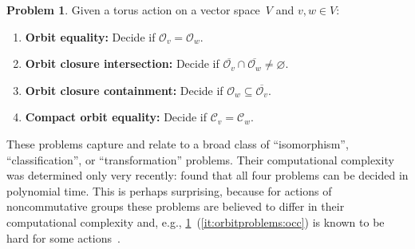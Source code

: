 \documentclass[10pt,a4paper]{article}
\theoremstyle{definition}
\newtheorem{problem}[theorem]{Problem}\crefname{problem}{Problem}{Problems}
\newcommand{\OO}{\ensuremath{\mathcal{O}}}
\newcommand{\KK}{\ensuremath{\mathcal{C}}}
\numberwithin{equation}{section}
\begin{document}
\begin{problem}\label{prob:orbitproblems}
  Given a torus action on a vector space~$V$ and $v,w\in V$:
  \begin{enumerate}
    \item\label{it:orbitproblems:eq} \textbf{Orbit equality:} Decide if $\OO_v=\OO_w$.
    \item\label{it:orbitproblems:oci} \textbf{Orbit closure intersection:} Decide if $\overline{\OO_v}\cap\overline{\OO_w}\ne\varnothing$.
    \item\label{it:orbitproblems:occ} \textbf{Orbit closure containment:} Decide if $\OO_w \subseteq \overline{\OO_v}$.
    \item\label{it:orbitproblems:compact eq} \textbf{Compact orbit equality:} Decide if $\KK_v=\KK_w$.
  \end{enumerate}
\end{problem}

These problems capture and relate to a broad class of ``isomorphism'', ``classification'', or ``transformation'' problems.
Their computational complexity was determined only very recently:
\cite{torus} found that all four problems can be decided in polynomial time.
This is perhaps surprising, because for actions of noncommutative groups these problems are believed to differ
in their computational complexity and, e.g., \cref{prob:orbitproblems}~(\ref{it:orbitproblems:occ})
is known to be hard for some actions~\cite{BILPS:20}.
\end{document}
